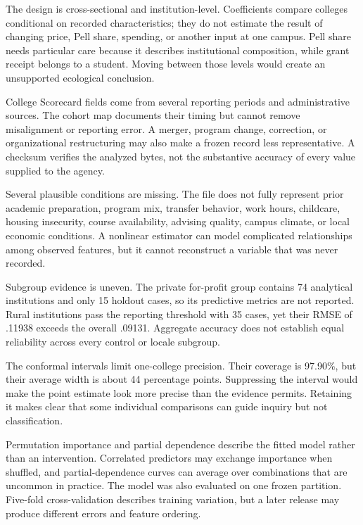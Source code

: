 \documentclass[12pt,a4paper]{article}
\begin{document}
The design is cross-sectional and institution-level. Coefficients compare colleges conditional on recorded characteristics; they do not estimate the result of changing price, Pell share, spending, or another input at one campus. Pell share needs particular care because it describes institutional composition, while grant receipt belongs to a student. Moving between those levels would create an unsupported ecological conclusion.

College Scorecard fields come from several reporting periods and administrative sources. The cohort map documents their timing but cannot remove misalignment or reporting error. A merger, program change, correction, or organizational restructuring may also make a frozen record less representative. A checksum verifies the analyzed bytes, not the substantive accuracy of every value supplied to the agency.

Several plausible conditions are missing. The file does not fully represent prior academic preparation, program mix, transfer behavior, work hours, childcare, housing insecurity, course availability, advising quality, campus climate, or local economic conditions. A nonlinear estimator can model complicated relationships among observed features, but it cannot reconstruct a variable that was never recorded.

Subgroup evidence is uneven. The private for-profit group contains 74 analytical institutions and only 15 holdout cases, so its predictive metrics are not reported. Rural institutions pass the reporting threshold with 35 cases, yet their RMSE of .11938 exceeds the overall .09131. Aggregate accuracy does not establish equal reliability across every control or locale subgroup.

The conformal intervals limit one-college precision. Their coverage is 97.90\%, but their average width is about 44 percentage points. Suppressing the interval would make the point estimate look more precise than the evidence permits. Retaining it makes clear that some individual comparisons can guide inquiry but not classification.

Permutation importance and partial dependence describe the fitted model rather than an intervention. Correlated predictors may exchange importance when shuffled, and partial-dependence curves can average over combinations that are uncommon in practice. The model was also evaluated on one frozen partition. Five-fold cross-validation describes training variation, but a later release may produce different errors and feature ordering.
\end{document}
